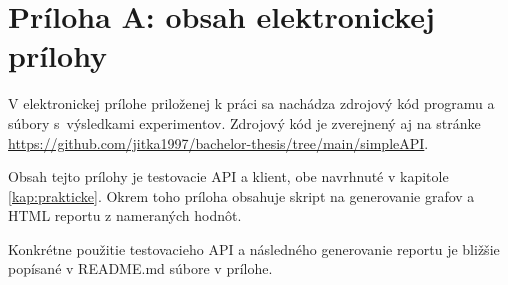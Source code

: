 \chapter*{Príloha A: obsah elektronickej prílohy}

V elektronickej prílohe priloženej k práci sa nachádza zdrojový kód
programu a súbory s~výsledkami experimentov. Zdrojový kód je
zverejnený aj na stránke \url{https://github.com/jitka1997/bachelor-thesis/tree/main/simpleAPI}.

Obsah tejto prílohy je testovacie API a klient, obe navrhnuté v kapitole \ref{kap:prakticke}. Okrem toho príloha obsahuje skript na generovanie grafov a HTML reportu z nameraných hodnôt.

Konkrétne použitie testovacieho API a následného generovanie reportu je bližšie popísané v README.md súbore v prílohe.

